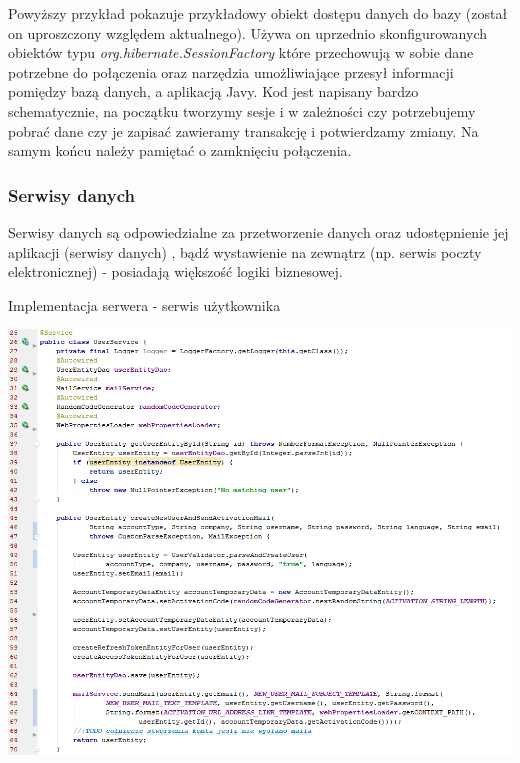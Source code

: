 \documentclass[10pt,titlepage]{article} %
\begin{document}
Powyższy przykład pokazuje przykładowy obiekt dostępu danych do bazy (został on uproszczony względem aktualnego). Używa on uprzednio skonfigurowanych obiektów typu \textit{org.hibernate.SessionFactory} które przechowują w sobie dane potrzebne do połączenia oraz narzędzia umożliwiające przesył informacji pomiędzy bazą danych, a aplikacją Javy.
Kod jest napisany bardzo schematycznie, na początku tworzymy sesje i w zależności czy potrzebujemy pobrać dane czy je zapisać zawieramy transakcję i potwierdzamy zmiany. Na samym końcu należy pamiętać o zamknięciu połączenia. 

\subsubsection{Serwisy danych}
Serwisy danych są odpowiedzialne za przetworzenie danych oraz udostępnienie jej aplikacji (serwisy danych) , bądź wystawienie na zewnątrz (np. serwis poczty elektronicznej) - posiadają większość logiki biznesowej.
\begin{listing}[H]
\caption[Implementacja serwera - serwis użytkownika]{Implementacja serwera - serwis użytkownika}
\includegraphics[width=1.0\textwidth, height=0.8\textheight]{img/sekcja3/backend/serwisUzytkownik}
\end{listing}
\end{document}
